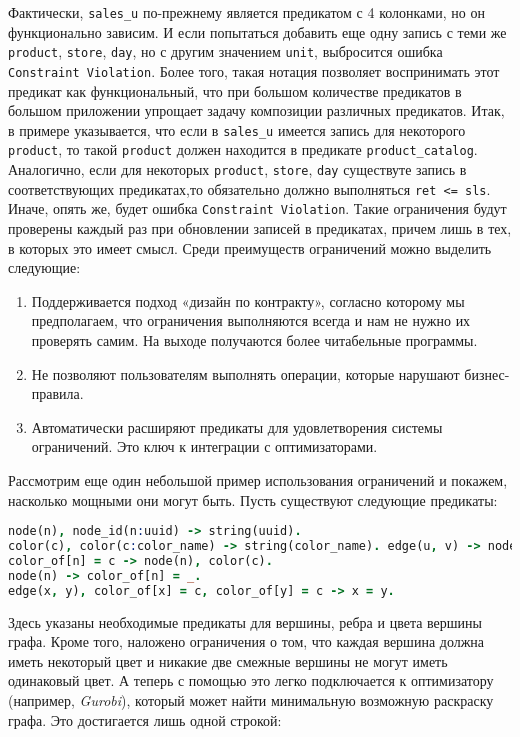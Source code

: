 Фактически, \lstinline{sales_u} по-прежнему является предикатом с 4 колонками, но он функционально зависим. И если попытаться добавить еще одну запись с теми же \lstinline{product}, \lstinline{store}, \lstinline{day}, но с другим значением \lstinline{unit}, выбросится ошибка \lstinline{Constraint Violation}. Более того, такая нотация позволяет воспринимать этот предикат как функциональный, что при большом количестве предикатов в большом приложении упрощает задачу композиции различных предикатов. Итак, в примере указывается, что если в \lstinline{sales_u} имеется запись для некоторого \lstinline{product}, то такой \lstinline{product} должен находится в предикате \lstinline{product_catalog}. Аналогично, если для некоторых \lstinline{product}, \lstinline{store}, \lstinline{day} существуте запись в соответствующих предикатах,то обязательно должно выполняться \lstinline{ret <= sls}. Иначе, опять же, будет ошибка \lstinline{Constraint Violation}. Такие ограничения будут проверены каждый раз при обновлении записей в предикатах, причем лишь в тех, в которых это имеет смысл.
Среди преимуществ ограничений можно выделить следующие:
\begin{enumerate}
  \item Поддерживается подход «дизайн по контракту», согласно которому мы предполагаем, что ограничения выполняются всегда и нам не нужно их проверять самим. На выходе получаются более читабельные программы.
  \item Не позволяют пользователям выполнять операции, которые нарушают бизнес-правила.
  \item Автоматически расширяют предикаты для удовлетворения системы ограничений. Это ключ к интеграции с оптимизаторами.
\end{enumerate}

Рассмотрим еще один небольшой пример использования ограничений и покажем, насколько мощными они могут быть. Пусть существуют следующие предикаты:

\begin{lstlisting}[language=Prolog]
node(n), node_id(n:uuid) -> string(uuid).
color(c), color(c:color_name) -> string(color_name). edge(u, v) -> node(u), node(v).
color_of[n] = c -> node(n), color(c).
node(n) -> color_of[n] = _.
edge(x, y), color_of[x] = c, color_of[y] = c -> x = y.
\end{lstlisting}

Здесь указаны необходимые предикаты для вершины, ребра и цвета вершины графа. Кроме того, наложено ограничения о том, что каждая вершина должна иметь некоторый цвет и никакие две смежные вершины не могут иметь одинаковый цвет. А теперь с помощью \LB это легко подключается к оптимизатору (например, \emph{Gurobi}), который может найти минимальную возможную раскраску графа. Это достигается лишь одной строкой:

